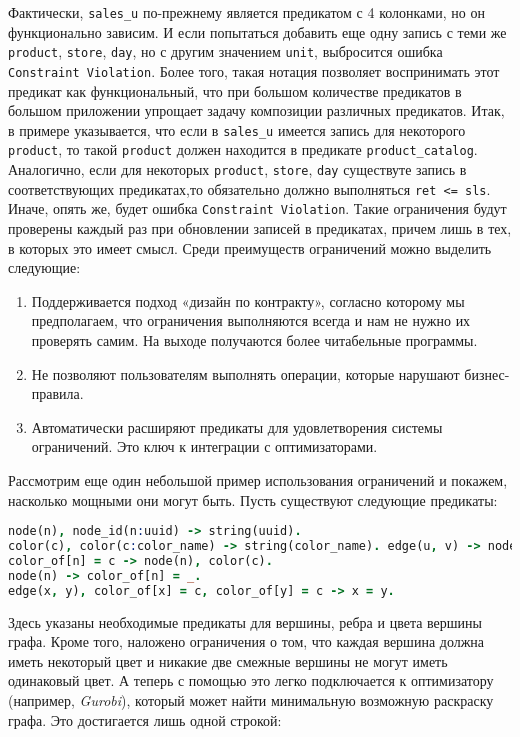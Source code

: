 Фактически, \lstinline{sales_u} по-прежнему является предикатом с 4 колонками, но он функционально зависим. И если попытаться добавить еще одну запись с теми же \lstinline{product}, \lstinline{store}, \lstinline{day}, но с другим значением \lstinline{unit}, выбросится ошибка \lstinline{Constraint Violation}. Более того, такая нотация позволяет воспринимать этот предикат как функциональный, что при большом количестве предикатов в большом приложении упрощает задачу композиции различных предикатов. Итак, в примере указывается, что если в \lstinline{sales_u} имеется запись для некоторого \lstinline{product}, то такой \lstinline{product} должен находится в предикате \lstinline{product_catalog}. Аналогично, если для некоторых \lstinline{product}, \lstinline{store}, \lstinline{day} существуте запись в соответствующих предикатах,то обязательно должно выполняться \lstinline{ret <= sls}. Иначе, опять же, будет ошибка \lstinline{Constraint Violation}. Такие ограничения будут проверены каждый раз при обновлении записей в предикатах, причем лишь в тех, в которых это имеет смысл.
Среди преимуществ ограничений можно выделить следующие:
\begin{enumerate}
  \item Поддерживается подход «дизайн по контракту», согласно которому мы предполагаем, что ограничения выполняются всегда и нам не нужно их проверять самим. На выходе получаются более читабельные программы.
  \item Не позволяют пользователям выполнять операции, которые нарушают бизнес-правила.
  \item Автоматически расширяют предикаты для удовлетворения системы ограничений. Это ключ к интеграции с оптимизаторами.
\end{enumerate}

Рассмотрим еще один небольшой пример использования ограничений и покажем, насколько мощными они могут быть. Пусть существуют следующие предикаты:

\begin{lstlisting}[language=Prolog]
node(n), node_id(n:uuid) -> string(uuid).
color(c), color(c:color_name) -> string(color_name). edge(u, v) -> node(u), node(v).
color_of[n] = c -> node(n), color(c).
node(n) -> color_of[n] = _.
edge(x, y), color_of[x] = c, color_of[y] = c -> x = y.
\end{lstlisting}

Здесь указаны необходимые предикаты для вершины, ребра и цвета вершины графа. Кроме того, наложено ограничения о том, что каждая вершина должна иметь некоторый цвет и никакие две смежные вершины не могут иметь одинаковый цвет. А теперь с помощью \LB это легко подключается к оптимизатору (например, \emph{Gurobi}), который может найти минимальную возможную раскраску графа. Это достигается лишь одной строкой:

